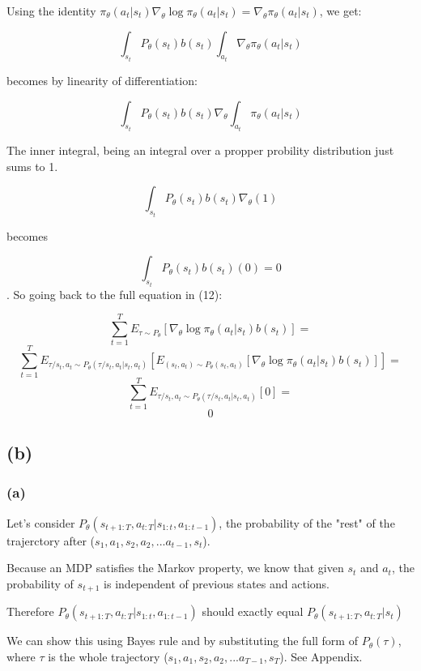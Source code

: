 \documentclass[a4paper]{article}
\begin{document}
Using the identity  $\pi_\theta(a_t | s_t) \nabla_\theta \log \pi_\theta (a_t|s_t) = \nabla_\theta
\pi_\theta (a_t|s_t)$, we get:

$$  \int_{s_t}  P_{\theta}(s_t) b(s_t) \int_{a_t} \nabla_\theta
\pi_\theta (a_t|s_t) $$

becomes by linearity of differentiation:

$$  \int_{s_t}  P_{\theta}(s_t) b(s_t) \nabla_\theta \int_{a_t} 
\pi_\theta (a_t|s_t) $$

The inner integral, being an integral over a propper probility distribution just sums to 1.

$$  \int_{s_t}  P_{\theta}(s_t) b(s_t) \nabla_\theta (1)$$

becomes

$$  \int_{s_t}  P_{\theta}(s_t) b(s_t) (0) = 0$$
.
So going back to the full equation in (12):

$$\sum_{t=1}^T E_{\tau \sim P_\theta}[\nabla_\theta \log \pi_\theta (a_t|s_t) b(s_t)] =$$
$$\sum_{t=1}^T E_{\tau/s_t,a_t \sim P_\theta(\tau/s_t,a_t | s_t, a_t)}[ E_{(s_t, a_t) \sim P_{\theta}(s_t, a_t)}[\nabla_\theta \log \pi_\theta (a_t|s_t) b(s_t)]] = $$
$$\sum_{t=1}^T E_{\tau/s_t,a_t \sim P_\theta(\tau/s_t,a_t | s_t, a_t)}[0] = $$
$$ 0 $$

\subsection*{(b)}

\subsubsection*{(a)}

Let's consider $P_\theta(s_{t+1:T}, a_{t:T} | s_{1:t}, a_{1:t-1})$, the probability of the "rest" of the trajerctory after ($s_1, a_1, s_2, a_2, ... a_{t-1}, s_t$).

Because an MDP satisfies the Markov property, we know that given $s_t$ and $a_t$, the probability of $s_{t+1}$ is independent of previous states and actions.

Therefore $P_\theta(s_{t+1:T}, a_{t:T} | s_{1:t}, a_{1:t-1})$ should exactly equal $P_\theta(s_{t+1:T}, a_{t:T} | s_t)$

We can show this using Bayes rule and by substituting the full form of $P_\theta(\tau)$, where $\tau$ is the whole trajectory ($s_1, a_1, s_2, a_2, ... a_{T-1}, s_T$). See Appendix.


\end{document}
